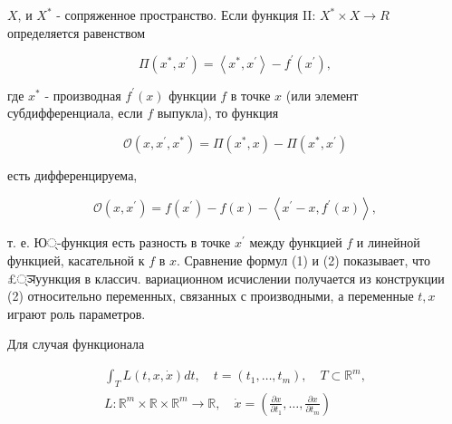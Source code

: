 \documentclass[10pt]{article}
\begin{document}
$X$, и $X^{*}$ - сопряженное пространство. Если функция II: $X^{*} \times X \rightarrow R$ определяется равенством



\[

\Pi\left(x^{*}, x^{\prime}\right)=\left\langle x^{*}, x^{\prime}\right\rangle-f^{\prime}\left(x^{\prime}\right),

\]



где $x^{*}$ - производная $f^{\prime}(x)$ функции $f$ в точке $x$ (или элемент субдифференциала, если $f$ выпукла), то функция



\[

\mathscr{O}\left(x, x^{\prime}, x^{*}\right)=\Pi\left(x^{*}, x\right)-\Pi\left(x^{*}, x^{\prime}\right)

\]



есть дифференцируема,



\[

\mathscr{O}\left(x, x^{\prime}\right)=f\left(x^{\prime}\right)-f(x)-\left\langle x^{\prime}-x, f^{\prime}(x)\right\rangle,

\]



т. е. Ю्-функция есть разность в точке $x^{\prime}$ между функцией $f$ и линейной функцией, касательной к $f$ в $x$. Сравнение формул (1) и (2) показывает, что £्ञуункция в классич. вариационном исчислении получается из конструкции (2) относительно переменных, связанных с производными, а переменные $t, x$ играют роль параметров.



Для случая функционала



\[

\begin{gathered}

\int_{T} L(t, x, \dot{x}) d t, \quad t=\left(t_{1}, \ldots, t_{m}\right), \quad T \subset \mathbb{R}^{m}, \\

L: \mathbb{R}^{m} \times \mathbb{R} \times \mathbb{R}^{m} \longrightarrow \mathbb{R}, \quad \dot{x}=\left(\frac{\partial x}{\partial t_{1}}, \ldots, \frac{\partial x}{\partial t_{m}}\right)

\end{gathered}

\]
\end{document}
